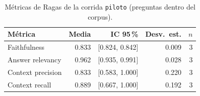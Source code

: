 \begin{table}[ht]
\centering
\begin{tabular}{lrrrr}
\toprule
Métrica & Media & IC 95\,\% & Desv.\ est. & $n$ \\
\midrule
Faithfulness & 0.833 & [0.824, 0.842] & 0.009 & 3 \\
Answer relevancy & 0.962 & [0.935, 0.991] & 0.028 & 3 \\
Context precision & 0.833 & [0.583, 1.000] & 0.220 & 3 \\
Context recall & 0.889 & [0.667, 1.000] & 0.192 & 3 \\
\bottomrule
\end{tabular}
\caption{Métricas de Ragas de la corrida \texttt{piloto} (preguntas dentro del corpus).}
\label{tab:ragas-piloto}
\end{table}